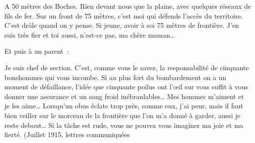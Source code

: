 \documentclass[french,twoside]{book} %
\newenvironment{quoteblock}%
  {\begin{quoting}}
  {\end{quoting}}
\newenvironment{quotebar}{%
    \def\FrameCommand{{\color{rubric!10!}\vrule width 0.5em} \hspace{0.9em}}%
    \def\OuterFrameSep{\itemsep} %
    \MakeFramed {\advance\hsize-\width \FrameRestore}
  }%
  {%
    \endMakeFramed
  }
\renewenvironment{quoteblock}%
  {%
    \savenotes
    \setstretch{0.9}
    \normalfont
    \begin{quotebar}
  }
  {%
    \end{quotebar}
    \spewnotes
  }
\begin{document}
\begin{quoteblock}
 \noindent A 50 mètres des Boches. Rien devant nous que la plaine, avec quelques réseaux de fils de fer. Sur un front de 75 mètres, c’est moi qui défends l’accès du territoire. C’est drôle quand on y pense. Si jeune, avoir à soi 75 mètres de frontière. J’en suis très fier et toi aussi, n’est-ce pas, ma chère maman…‌
 \end{quoteblock}

\noindent Et puis à un parent :‌\par

\begin{quoteblock}
 \noindent Je suis chef de section. C’est, comme vous le savez, la responsabilité de cinquante bonshommes qui vous incombe. Si au plus fort du bombardement on a un moment de défaillance, l’idée que cinquante poilus ont l’œil sur vous suffit à vous donner une assurance et un sang froid inébranlables… Mes hommes m’aiment et je les aime… Lorsqu’un obus éclate trop près, comme eux, j’ai peur, mais il faut bien veiller sur le morceau de la frontière que l’on m’a donné à garder, aussi je reste debout… Si la tâche est rude, vous ne pouvez vous imaginer ma joie et ma fierté. (Juillet 1915, lettres communiquées‌
 \end{quoteblock}
\end{document}
